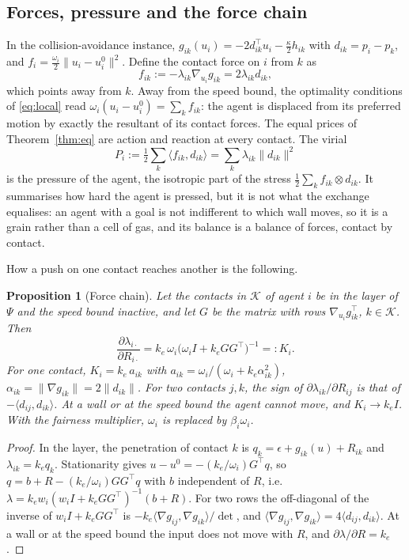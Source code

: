 \documentclass[11pt]{article}
\newtheorem{proposition}[theorem]{Proposition}
\theoremstyle{definition}
\theoremstyle{remark}
\begin{document}
\subsection{Forces, pressure and the force chain}\label{sec:force}
In the collision-avoidance instance, $g_{ik}(u_i)=-2d_{ik}^\top u_i-\frac\kappa2h_{ik}$ with $d_{ik}=p_i-p_k$, and $f_i=\frac{\omega_i}2\|u_i-u_i^0\|^2$. Define the contact force on $i$ from $k$ as
\[
f_{ik}:=-\lambda_{ik}\nabla_{u_i}g_{ik}=2\lambda_{ik}d_{ik},
\]
which points away from $k$. Away from the speed bound, the optimality conditions of \eqref{eq:local} read $\omega_i(u_i-u_i^0)=\sum_kf_{ik}$: the agent is displaced from its preferred motion by exactly the resultant of its contact forces. The equal prices of Theorem~\ref{thm:eq} are action and reaction at every contact. The virial
\[
P_i:=\tfrac12\sum_k\langle f_{ik},d_{ik}\rangle=\sum_k\lambda_{ik}\|d_{ik}\|^2
\]
is the pressure of the agent, the isotropic part of the stress $\frac12\sum_kf_{ik}\otimes d_{ik}$. It summarises how hard the agent is pressed, but it is not what the exchange equalises: an agent with a goal is not indifferent to which wall moves, so it is a grain rather than a cell of gas, and its balance is a balance of forces, contact by contact.

How a push on one contact reaches another is the following.

\begin{proposition}[Force chain]\label{prop:transfer}
Let the contacts in $\mathcal K$ of agent $i$ be in the layer of $\Psi$ and the speed bound inactive, and let $G$ be the matrix with rows $\nabla_{u_i}g_{ik}^\top$, $k\in\mathcal K$. Then
\[
\frac{\partial\lambda_{i\cdot}}{\partial R_{i\cdot}}=k_e\,\omega_i\big(\omega_iI+k_eGG^\top\big)^{-1}=:K_i .
\]
For one contact, $K_i=k_e\,a_{ik}$ with $a_{ik}=\omega_i/(\omega_i+k_e\alpha_{ik}^2)$, $\alpha_{ik}=\|\nabla g_{ik}\|=2\|d_{ik}\|$. For two contacts $j,k$, the sign of $\partial\lambda_{ik}/\partial R_{ij}$ is that of $-\langle d_{ij},d_{ik}\rangle$. At a wall or at the speed bound the agent cannot move, and $K_i\to k_eI$. With the fairness multiplier, $\omega_i$ is replaced by $\beta_i\omega_i$.
\end{proposition}
\begin{proof}
In the layer, the penetration of contact $k$ is $q_k=\epsilon+g_{ik}(u)+R_{ik}$ and $\lambda_{ik}=k_eq_k$. Stationarity gives $u-u^0=-(k_e/\omega_i)G^\top q$, so $q=b+R-(k_e/\omega_i)GG^\top q$ with $b$ independent of $R$, i.e.\ $\lambda=k_ew_i(w_iI+k_eGG^\top)^{-1}(b+R)$. For two rows the off-diagonal of the inverse of $w_iI+k_eGG^\top$ is $-k_e\langle\nabla g_{ij},\nabla g_{ik}\rangle/\det$, and $\langle\nabla g_{ij},\nabla g_{ik}\rangle=4\langle d_{ij},d_{ik}\rangle$. At a wall or at the speed bound the input does not move with $R$, and $\partial\lambda/\partial R=k_e$.
\end{proof}
\end{document}
